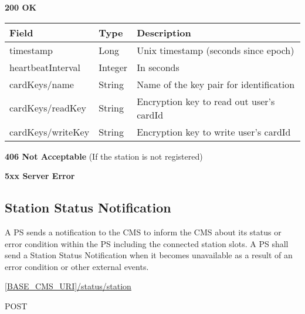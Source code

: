 \textbf{200 OK}

\begin{tabularx}{\linewidth}{ | l | l | X | }
  \hline
  \rowcolor{table-head}
  Field & Type & Description \\
  \hline
  timestamp & Long & Unix timestamp (seconds since epoch) \\
  heartbeatInterval & Integer & In seconds \\
  cardKeys/name 		& String & Name of the key pair for identification \\
  cardKeys/readKey 	& String & Encryption key to read out user's cardId \\
  cardKeys/writeKey 	& String & Encryption key to write user's cardId \\
  \hline
\end{tabularx}

\textbf{406 Not Acceptable} (If the station is not registered)

\textbf{5xx Server Error}

\subsection{Station Status Notification}

A \acs{PS} sends a notification to the \acs{CMS} to inform the \acs{CMS} about its status or error condition within the \acs{PS} including the connected station slots. A \acs{PS} shall send a Station Status Notification when it becomes unavailable as a result of an error condition or other external events.

 \url{[BASE_CMS_URI]/status/station}

 POST

